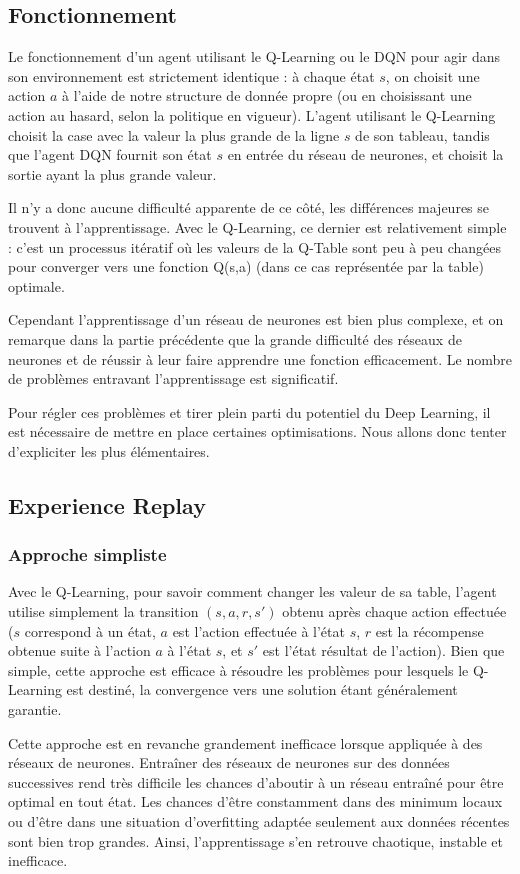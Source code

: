 \subsection{Fonctionnement}
Le fonctionnement d'un agent utilisant le Q-Learning ou le DQN pour agir dans son environnement est strictement identique : à chaque état $s$, on choisit une action $a$ à l'aide de notre structure de donnée propre (ou en choisissant une action au hasard, selon la politique en vigueur). L'agent utilisant le Q-Learning choisit la case avec la valeur la plus grande de la ligne $s$ de son tableau, tandis que l'agent DQN fournit son état $s$ en entrée du réseau de neurones, et choisit la sortie ayant la plus grande valeur.
\par
Il n'y a donc aucune difficulté apparente de ce côté, les différences majeures se trouvent à l'apprentissage.
Avec le Q-Learning, ce dernier est relativement simple : c'est un processus itératif où les valeurs de la Q-Table sont peu à peu changées pour converger vers une fonction Q(s,a) (dans ce cas représentée par la table) optimale. 
\par
Cependant l'apprentissage d'un réseau de neurones est bien plus complexe, et on remarque dans la partie précédente que la grande difficulté des réseaux de neurones et de réussir à leur faire apprendre une fonction efficacement. Le nombre de problèmes entravant l'apprentissage est significatif.
\par
Pour régler ces problèmes et tirer plein parti du potentiel du Deep Learning, il est nécessaire de mettre en place certaines optimisations. Nous allons donc tenter d'expliciter les plus élémentaires.

\subsection{Experience Replay}
\subsubsection{Approche simpliste}
Avec le Q-Learning, pour savoir comment changer les valeur de sa table, l'agent utilise simplement la transition $(s,a,r,s')$ obtenu après chaque action effectuée ($s$ correspond à un état, $a$ est l'action effectuée à l'état $s$, $r$ est la récompense obtenue suite à l'action $a$ à l'état $s$, et $s'$ est l'état résultat de l'action).
Bien que simple, cette approche est efficace à résoudre les problèmes pour lesquels le Q-Learning est destiné, la convergence vers une solution étant généralement garantie.
\par
Cette approche est en revanche grandement inefficace lorsque appliquée à des réseaux de neurones. Entraîner des réseaux de neurones sur des données successives rend très difficile les chances d'aboutir à un réseau entraîné pour être optimal en tout état. Les chances d'être constamment dans des minimum locaux ou d'être dans une situation d'overfitting adaptée seulement aux données récentes sont bien trop grandes. Ainsi, l'apprentissage s'en retrouve chaotique, instable et inefficace.

